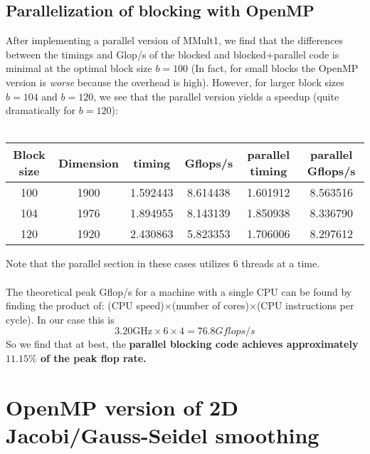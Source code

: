 \documentclass[10pt, letterpaper]{article}
\begin{document}
\subsection{Parallelization of blocking with OpenMP}
After implementing a parallel version of MMult1, we find that the differences between the timings and Glop/s of the blocked and blocked+parallel code is minimal at the optimal block size $b=100$ (In fact, for small blocks the OpenMP version is \emph{worse} because the overhead is high). However, for larger block sizes $b=104$ and $b=120$, we see that the parallel version yields a speedup (quite dramatically for $b=120$):\\\\
\begin{tabular}{|c|c||c|c||c|c|}
  \hline
  Block size & Dimension & timing & Gflops/s & parallel timing & parallel Gflops/s \\ \hline \hline
  100 & 1900 & 1.592443 & 8.614438 & 1.601912 & 8.563516\\ \hline
  104 & 1976 & 1.894955 & 8.143139 & 1.850938 & 8.336790\\ \hline
  120 & 1920 & 2.430863 & 5.823353 & 1.706006 & 8.297612\\
  \hline
\end{tabular}
Note that the parallel section in these cases utilizes 6 threads at a time.\\\\
The theoretical peak Gflop/s for a machine with a single CPU can be found by finding the product of: (CPU speed)$\times$(number of cores)$\times$(CPU instructions per cycle). In our case this is
\[
3.20\text{GHz}\times 6 \times 4 = 76.8 Gflops/s
\]
So we find that at best, the \textbf{parallel blocking code achieves approximately $11.15\%$ of the peak flop rate.}

\newpage
\section{OpenMP version of 2D Jacobi/Gauss-Seidel smoothing}
\end{document}
